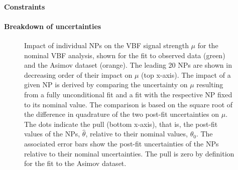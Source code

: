 \paragraph{Constraints}
\paragraph{Breakdown of uncertainties}



\begin{figure}[th]
    \centering
    {\caption{Impact of individual NPs on the VBF signal strength $\mu$ for the nominal VBF analysis, shown for the fit to observed data (green) and the Asimov dataset (orange). The leading 20 NPs are shown in decreasing order of their impact on $\mu$ (top x-axis).
    The impact of a given NP is derived by comparing the uncertainty on $\mu$ resulting from a fully unconditional fit and a fit with the respective NP fixed to its nominal value. The comparison is based on the square root of the difference in quadrature of the two post-fit uncertainties on $\mu$. 
    The dots indicate the pull (bottom x-axis), that is, the post-fit values of the NPs, $\hat{\theta}$, relative to their nominal values, $\theta_0$. 
    The associated error bars show the post-fit uncertainties of the NPs relative to their nominal uncertainties. 
    The pull is zero by definition for the fit to the Asimov dataset.
    \label{fig:fit:breakdown} }}
\end{figure}





